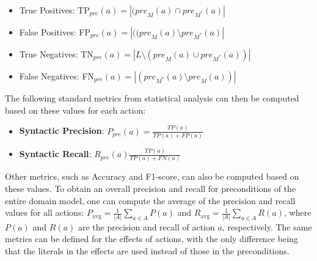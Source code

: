 \documentclass[letterpaper]{article} %
\newcommand{\pre}{\ensuremath{\textit{pre}}\xspace}
\newcommand{\eff}{\ensuremath{\textit{eff}}\xspace}
\newcommand{\realm}{{\ensuremath{M^*}}\xspace}
\newif\ifaddcomments
\newcommand{\mauro}[1]{\ifaddcomments{\textcolor{green}{[Mauro: #1]}}\fi}
\begin{document}
 \begin{itemize}
    \item True Positives: TP$_\pre(a)=|(\pre_M(a)\cap \pre_\realm(a)|$
    \item False Positives: FP$_\pre(a)=|((\pre_M(a)\setminus \pre_\realm(a)|$
    \item True Negatives: TN$_\pre(a)=|L \setminus(\pre_M(a)\cup \pre_\realm(a))|$
    \item False Negatives: FN$_\pre(a)=|(\pre_\realm(a)\setminus \pre_M(a))|$
\end{itemize}
The following standard metrics from statistical analysis can then be computed based on these values for each action:
\begin{itemize}
    \item \textbf{Syntactic Precision}: $P_\pre(a)=\frac{TP(a)}{TP(a)+FP(a)}$
    \item \textbf{Syntactic Recall}: $R_\pre(a)\frac{TP(a)}{TP(a)+FN(a)}$
\end{itemize}
Other metrics, such as Accuracy and F1-score, can also be computed based on these values. 
To obtain an overall precision and recall for preconditions of the entire domain model, one can compute the average of the precision and recall values for all actions:
$P_\text{avg}=\frac{1}{|A|}\sum_{a\in A} P(a)$ and $R_\text{avg}=\frac{1}{|A|}\sum_{a\in A} R(a)$, where $P(a)$ and $R(a)$ are the precision and recall of action $a$, respectively. 
The same metrics can be defined for the effects of actions, with the only difference being that the literals in the effects are used instead of those in the preconditions. 
\end{document}
